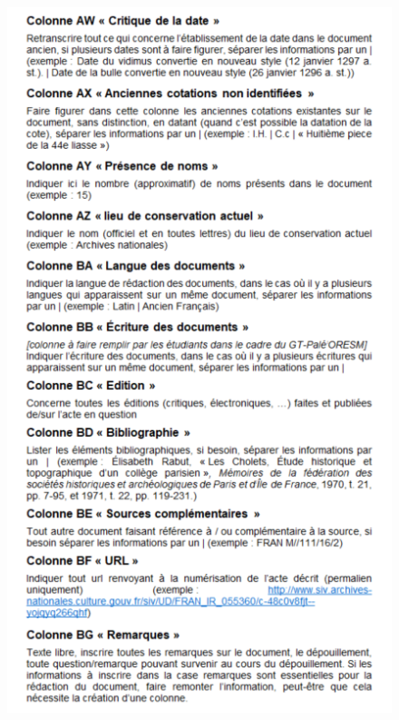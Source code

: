 \begin{figure}[!h]
    \centering
    \includegraphics[width=0.85\linewidth]{annexes/methodologie6.png}
\end{figure}
